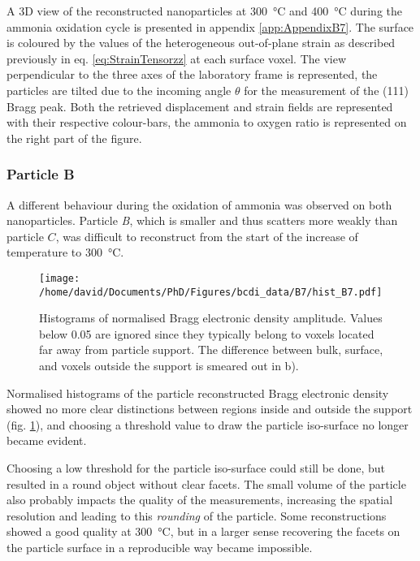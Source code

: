 A 3D view of the reconstructed nanoparticles at \qty{300}{\degreeCelsius} and \qty{400}{\degreeCelsius} during the ammonia oxidation cycle is presented in appendix \ref{app:AppendixB7}.
The surface is coloured by the values of the heterogeneous out-of-plane strain as described previously in eq. \ref{eq:StrainTensorzz} at each surface voxel.
The view perpendicular to the three axes of the laboratory frame is represented, the particles are tilted due to the incoming angle $\theta$ for the measurement of the (111) Bragg peak.
Both the retrieved displacement and strain fields are represented with their respective colour-bars, the ammonia to oxygen ratio is represented on the right part of the figure.

\subsubsection{Particle B}

A different behaviour during the oxidation of ammonia was observed on both nanoparticles.
Particle \textit{B}, which is smaller and thus scatters more weakly than particle $C$, was difficult to reconstruct from the start of the increase of temperature to \qty{300}{\degreeCelsius}.

\begin{figure}[!htb]
    \centering
    \texttt{[image: /home/david/Documents/PhD/Figures/bcdi\_data/B7/hist\_B7.pdf]}
    \caption{
        Histograms of normalised Bragg electronic density amplitude.
        Values below 0.05 are ignored since they typically belong to voxels located far away from particle support.
        The difference between bulk, surface, and voxels outside the support is smeared out in b).
    }
    \label{fig:B7Histo}
\end{figure}

Normalised histograms of the particle reconstructed Bragg electronic density showed no more clear distinctions between regions inside and outside the support (fig. \ref{fig:B7Histo}), and choosing a threshold value to draw the particle iso-surface no longer became evident.

Choosing a low threshold for the particle iso-surface could still be done, but resulted in a round object without clear facets.
The small volume of the particle also probably impacts the quality of the measurements, increasing the spatial resolution and leading to this \textit{rounding} of the particle.
Some reconstructions showed a good quality at \qty{300}{\degreeCelsius}, but in a larger sense recovering the facets on the particle surface in a reproducible way became impossible.

